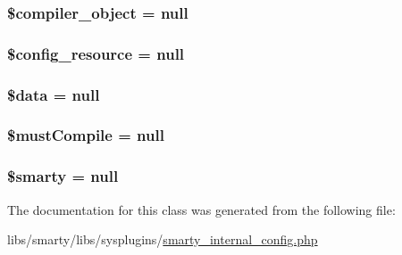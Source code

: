 \subsubsection[{\$compiler\+\_\+object}]{\setlength{\rightskip}{0pt plus 5cm}\$compiler\+\_\+object = null}\label{class_smarty___internal___config_acded937e862d2f39574b6b4b51f1c69e}
\hypertarget{class_smarty___internal___config_a7741aae0e9796b00471e2c34a1a0bd70}{}
\subsubsection[{\$config\+\_\+resource}]{\setlength{\rightskip}{0pt plus 5cm}\$config\+\_\+resource = null}\label{class_smarty___internal___config_a7741aae0e9796b00471e2c34a1a0bd70}
\hypertarget{class_smarty___internal___config_a6efc15b5a2314dd4b5aaa556a375c6d6}{}
\subsubsection[{\$data}]{\setlength{\rightskip}{0pt plus 5cm}\$data = null}\label{class_smarty___internal___config_a6efc15b5a2314dd4b5aaa556a375c6d6}
\hypertarget{class_smarty___internal___config_a9faa5e2c2d86463859252cc6962ed9a0}{}
\subsubsection[{\$must\+Compile}]{\setlength{\rightskip}{0pt plus 5cm}\${\bf must\+Compile} = null}\label{class_smarty___internal___config_a9faa5e2c2d86463859252cc6962ed9a0}
\hypertarget{class_smarty___internal___config_ac3ae29e9ccbb2006fa26fd9eb2c12117}{}
\subsubsection[{\$smarty}]{\setlength{\rightskip}{0pt plus 5cm}\$smarty = null}\label{class_smarty___internal___config_ac3ae29e9ccbb2006fa26fd9eb2c12117}


The documentation for this class was generated from the following file\+:\begin{DoxyCompactItemize}
\item 
libs/smarty/libs/sysplugins/\hyperlink{smarty__internal__config_8php}{smarty\+\_\+internal\+\_\+config.\+php}\end{DoxyCompactItemize}
